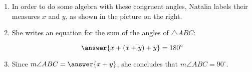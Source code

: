 \documentclass[nooutcomes]{ximera}
\begin{document}
\begin{problem}
\begin{enumerate}
\item In order to do some algebra with these congruent angles, Natalia labels their measures $x$ and $y$, as shown in the picture on the right.  

\item She writes an equation for the sum of the angles of $\triangle ABC$: 

\[
\answer{x+(x+y)+y} = 180^\circ
\]

  
\item Since $m\angle ABC = \answer{x+y}$, she concludes that $m\angle ABC = 90^\circ$.  

\end{enumerate}
\end{problem}
\end{document}
